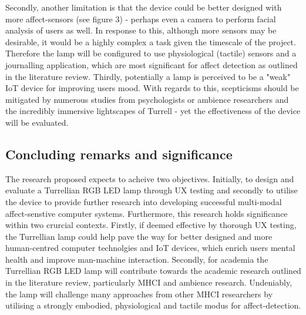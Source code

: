 \documentclass{sigchi}
\begin{document}
Secondly, another limitation is that the device could be better designed with more affect-sensors (see figure 3) - perhaps even a camera to perform facial analysis of users as well. In response to this, although more sensors may be desirable, it would be a highly complex a task given the timescale of the project. Therefore the lamp will be configured to use physiological (tactile) sensors and a journalling application, which are most significant for affect detection as outlined in the literature review. Thirdly, potentially a lamp is perceived to be a "weak" IoT device for improving users mood. With regards to this, scepticisms should be mitigated by numerous studies from psychologists or ambience researchers and the incredibly immersive lightscapes of Turrell - yet the effectiveness of the device will be evaluated.   

\subsection{Concluding remarks and significance}

The research proposed expects to acheive two objectives. Initially, to design and evaluate a Turrellian RGB LED lamp through UX testing and secondly to utilise the device to provide further research into developing successful multi-modal affect-senstive computer systems. Furthermore, this research holds significance within two crurcial contexts. Firstly, if deemed effective by thorough UX testing, the Turrellian lamp could help pave the way for better designed and more human-centred computer technolgies and IoT devices, which enrich users mental health and improve man-machine interaction. Secondly, for academia the Turrellian RGB LED lamp will contribute towards the academic research outlined in the literature review, particularly MHCI and ambience research. Undeniably, the lamp will challenge many approaches from other MHCI researchers by utilising a strongly embodied, physiological and tactile modus for affect-detection. 
\end{document}
